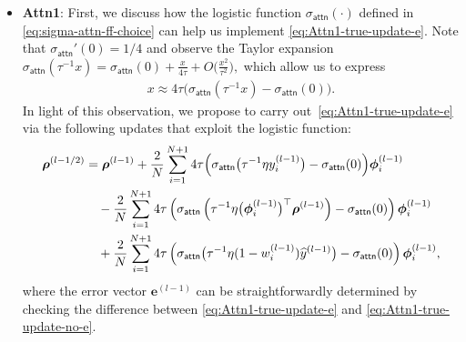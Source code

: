 \documentclass[english]{article}
\begin{document}
\begin{itemize}

\item \textbf{Attn1}: 
%
First, we discuss how the logistic function $\sigma_{\mathsf{attn}}(\cdot)$  defined in 
\eqref{eq:sigma-attn-ff-choice} can help us implement \eqref{eq:Attn1-true-update-e}.  Note that  $\sigma_{\mathsf{attn}}'(0) = 1/4$ and observe the Taylor expansion
$
\sigma_{\mathsf{attn}}(\tau^{-1}x) = \sigma_{\mathsf{attn}}(0) + \frac{x}{4
\tau} + O\big(\frac{x^2}{\tau^2}\big), 
$
which allow us to express
%
\begin{align}\label{eq:approx-sigma-attn}
x\approx 4\tau\big(\sigma_{\mathsf{attn}}(\tau^{-1}x) - \sigma_{\mathsf{attn}}(0)\big).
\end{align}
%
In light of this observation, we propose to carry out~\eqref{eq:Attn1-true-update-e} via the following updates that exploit the logistic function: 
%
\begin{align}
{\bm \rho}^{(l-1/2)} &={\bm \rho}^{(l-1)} + \frac{2}{N}\sum_{i=1}^{N+1}4\tau\Big(\sigma_{\mathsf{attn}}\big(\tau^{-1}\eta y_i^{(l-1)}\big) - \sigma_{\mathsf{attn}}(0)\Big){\bm \phi}_i^{(l-1)} \notag\\
&\quad - \frac{2}{N}\sum_{i=1}^{N+1}4\tau\left(\sigma_{\mathsf{attn}}\left(\tau^{-1}\eta \big({\bm \phi}_i^{(l-1)}\big)^{\top}{\bm \rho}^{(l-1)}\right) - \sigma_{\mathsf{attn}}(0)\right){\bm \phi}_i^{(l-1)} \notag\\
&\quad + \frac{2}{N}\sum_{i=1}^{N+1}4\tau\left(\sigma_{\mathsf{attn}}\big(\tau^{-1}\eta (1-{w}_i^{(l-1)})\widehat{y}^{(l-1)}\big) - \sigma_{\mathsf{attn}}(0)\right){\bm \phi}_i^{(l-1)},
\label{eq:Attn1-true-update-no-e}
\end{align}
%
where the error vector $\bm{e}^{(l-1)}$ can be straightforwardly determined by checking the difference between \eqref{eq:Attn1-true-update-e} and \eqref{eq:Attn1-true-update-no-e}. 

\end{itemize}
\end{document}
